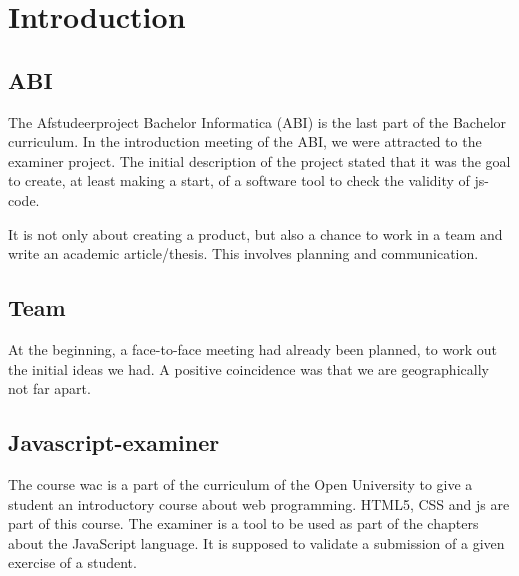 \chapter{Introduction}


\section{ABI} 

The Afstudeerproject Bachelor Informatica (ABI) is the last part of the Bachelor curriculum.
In the introduction meeting of the ABI, we were attracted to the \gls{examiner} project.
The initial description of the project stated that it was the goal to create,
at least making a start, of a software tool to check the validity
of \gls{js-code}.

It is not only about creating a product, but also a chance to work in a team and write an academic article/thesis.
This involves planning and communication.


\section{Team}
At the beginning, a face-to-face meeting had already been planned, to work out the initial ideas we had.
A positive coincidence was that we are geographically not far apart.


\section{Javascript-examiner}
The course \gls{wac} is a part of the curriculum of the Open University to give
a student an introductory course about web programming.
HTML5, CSS and \gls{js} are part of this course.
The \gls{examiner} is a tool to be used as part of the chapters about the JavaScript language.
It is supposed to validate a submission of a given exercise of a student.


